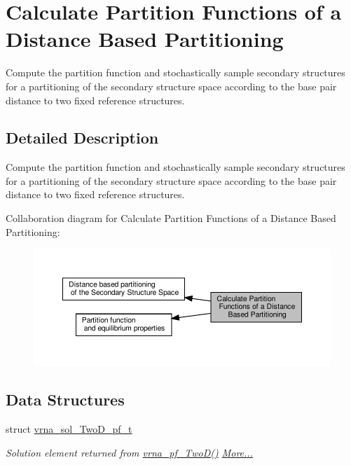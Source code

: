 \hypertarget{group__kl__neighborhood__pf}{}\section{Calculate Partition Functions of a Distance Based Partitioning}
\label{group__kl__neighborhood__pf}


Compute the partition function and stochastically sample secondary structures for a partitioning of the secondary structure space according to the base pair distance to two fixed reference structures.  




\subsection{Detailed Description}
Compute the partition function and stochastically sample secondary structures for a partitioning of the secondary structure space according to the base pair distance to two fixed reference structures. 

Collaboration diagram for Calculate Partition Functions of a Distance Based Partitioning\+:
\nopagebreak
\begin{figure}[H]
\begin{center}
\leavevmode
\includegraphics[width=350pt]{group__kl__neighborhood__pf}
\end{center}
\end{figure}
\subsection*{Data Structures}
\begin{DoxyCompactItemize}
\item 
struct \hyperlink{group__kl__neighborhood__pf_structvrna__sol__TwoD__pf__t}{vrna\+\_\+sol\+\_\+\+Two\+D\+\_\+pf\+\_\+t}
\begin{DoxyCompactList}\small\item\em Solution element returned from \hyperlink{group__kl__neighborhood__pf_ga0bc3427689bd09da09b8b3094a27f836}{vrna\+\_\+pf\+\_\+\+Two\+D()}  \hyperlink{group__kl__neighborhood__pf_structvrna__sol__TwoD__pf__t}{More...}\end{DoxyCompactList}\end{DoxyCompactItemize}
